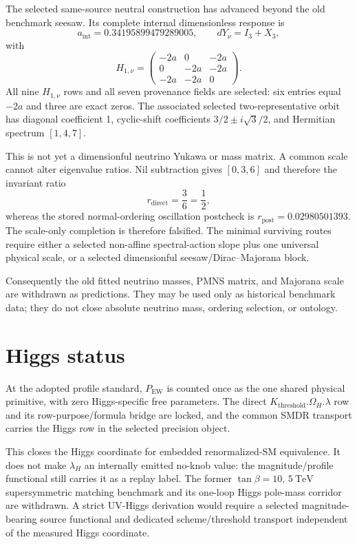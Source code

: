 \documentclass[11pt]{article}
\begin{document}
The selected same-source neutral construction has advanced beyond the old
benchmark seesaw. Its complete internal dimensionless response is
\begin{equation}
a_{\mathrm{int}}=0.34195899479289005,
\qquad dY_\nu=I_3+X_3,
\end{equation}
with
\begin{equation}
H_{1,\nu}=
\begin{pmatrix}
-2a&0&-2a\\
0&-2a&-2a\\
-2a&-2a&0
\end{pmatrix}.
\end{equation}
All nine $H_{1,\nu}$ rows and all seven provenance fields are selected: six
entries equal $-2a$ and three are exact zeros. The associated selected
two-representative orbit has diagonal coefficient 1, cyclic-shift coefficients
$3/2\pm i\sqrt3/2$, and Hermitian spectrum $[1,4,7]$.

This is not yet a dimensionful neutrino Yukawa or mass matrix. A common scale
cannot alter eigenvalue ratios. Nil subtraction gives $[0,3,6]$ and therefore
the invariant ratio
\[
r_{\mathrm{direct}}=\frac{3}{6}=\frac12,
\]
whereas the stored normal-ordering oscillation postcheck is
$r_{\mathrm{post}}=0.02980501393$. The scale-only completion is therefore
falsified. The minimal surviving routes require either a selected non-affine
spectral-action slope plus one universal physical scale, or a selected
dimensionful seesaw/Dirac--Majorana block.

Consequently the old fitted neutrino masses, PMNS matrix, and Majorana scale are
withdrawn as predictions. They may be used only as historical benchmark data;
they do not close absolute neutrino mass, ordering selection, or ontology.

\section{Higgs status}

At the adopted profile standard, $P_{\mathrm{EW}}$ is counted once as the one
shared physical primitive, with zero Higgs-specific free parameters. The direct
$K_{\mathrm{threshold}}.\Omega_H.\lambda$ row and its row-purpose/formula bridge
are locked, and the common SMDR transport carries the Higgs row in the selected
precision object.

This closes the Higgs coordinate for embedded renormalized-SM equivalence. It
does not make $\lambda_H$ an internally emitted no-knob value: the
magnitude/profile functional still carries it as a replay label. The former
$\tan\beta=10$, $5~\mathrm{TeV}$ supersymmetric matching benchmark and its
one-loop Higgs pole-mass corridor are withdrawn. A strict UV-Higgs derivation
would require a selected magnitude-bearing source functional and dedicated
scheme/threshold transport independent of the measured Higgs coordinate.
\end{document}

